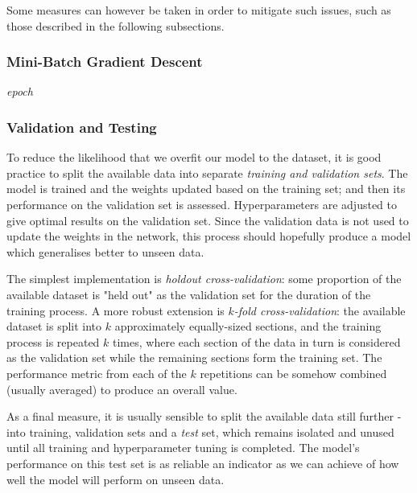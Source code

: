 \documentclass{article}[11pt]
\begin{document}
        Some measures can however be taken in order to mitigate such issues, such as those described in the following subsections.        
        
        
        \subsubsection{Mini-Batch Gradient Descent}
            
            \textit{epoch}
            
            
            
        
        \subsubsection{Validation and Testing}
            
            To reduce the likelihood that we overfit our model to the dataset, it is good practice to split the available data into separate \textit{training and validation sets}. The model is trained and the weights updated based on the training set; and then its performance on the validation set is assessed. Hyperparameters are adjusted to give optimal results on the validation set. Since the validation data is not used to update the weights in the network, this process should hopefully produce a model which generalises better to unseen data.
            
            The simplest implementation is \textit{holdout cross-validation}: some proportion of the available dataset is "held out" as the validation set for the duration of the training process. A more robust extension is \textit{$k$-fold cross-validation}: the available dataset is split into $k$ approximately equally-sized sections, and the training process is repeated $k$ times, where each section of the data in turn is considered as the validation set while the remaining sections form the training set. The performance metric from each of the $k$ repetitions can be somehow combined (usually averaged) to produce an overall value.
            
            As a final measure, it is usually sensible to split the available data still further - into training, validation sets and a \textit{test} set, which remains isolated and unused until all training and hyperparameter tuning is completed. The model's performance on this test set is as reliable an indicator as we can achieve of how well the model will perform on unseen data.
            
\end{document}
